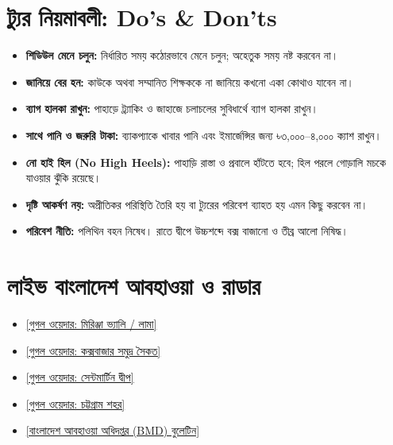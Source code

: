 \documentclass[11pt]{article}
\begin{document}
\section*{ট্যুর নিয়মাবলী: Do's \& Don'ts}
\begin{tcolorbox}[colframe=primary, colback=white, title=\textbf{অবশ্যই পালনীয় (Do's)}]
\small
\begin{itemize}
    \item \textbf{শিডিউল মেনে চলুন:} নির্ধারিত সময় কঠোরভাবে মেনে চলুন; অহেতুক সময় নষ্ট করবেন না।
    \item \textbf{জানিয়ে বের হন:} কাউকে অথবা সম্মানিত শিক্ষককে না জানিয়ে কখনো একা কোথাও যাবেন না।
    \item \textbf{ব্যাগ হালকা রাখুন:} পাহাড়ে ট্র্যাকিং ও জাহাজে চলাচলের সুবিধার্থে ব্যাগ হালকা রাখুন।
    \item \textbf{সাথে পানি ও জরুরি টাকা:} ব্যাকপ্যাকে খাবার পানি এবং ইমার্জেন্সির জন্য ৳৩,০০০--৪,০০০ ক্যাশ রাখুন।
\end{itemize}
\end{tcolorbox}

\vspace{1mm}
\begin{tcolorbox}[colframe=danger, colback=white, title=\textbf{যা একদমই করবেন না (Don'ts)}]
\small
\begin{itemize}
    \item \textbf{নো হাই হিল (No High Heels):} পাহাড়ি রাস্তা ও প্রবালে হাঁটতে হবে; হিল পরলে গোড়ালি মচকে যাওয়ার ঝুঁকি রয়েছে।
    \item \textbf{দৃষ্টি আকর্ষণ নয়:} অপ্রীতিকর পরিস্থিতি তৈরি হয় বা ট্যুরের পরিবেশ ব্যাহত হয় এমন কিছু করবেন না।
    \item \textbf{পরিবেশ নীতি:} পলিথিন বহন নিষেধ। রাতে দ্বীপে উচ্চশব্দে বক্স বাজানো ও তীব্র আলো নিষিদ্ধ।
\end{itemize}
\end{tcolorbox}

\newpage

\section*{লাইভ বাংলাদেশ আবহাওয়া ও রাডার}
\small
\begin{itemize}
    \item \href{https://www.google.com/search?q=weather+Lama+Bandarban+Bangladesh}{\color{primary}[গুগল ওয়েদার: মিরিঞ্জা ভ্যালি / লামা]}
    \item \href{https://www.google.com/search?q=weather+Coxs+Bazar+Bangladesh}{\color{primary}[গুগল ওয়েদার: কক্সবাজার সমুদ্র সৈকত]}
    \item \href{https://www.google.com/search?q=weather+Saint+Martin+Island+Bangladesh}{\color{primary}[গুগল ওয়েদার: সেন্টমার্টিন দ্বীপ]}
    \item \href{https://www.google.com/search?q=weather+Chittagong+Bangladesh}{\color{primary}[গুগল ওয়েদার: চট্টগ্রাম শহর]}
    \item \href{http://live4.bmd.gov.bd/}{\color{primary}[বাংলাদেশ আবহাওয়া অধিদপ্তর (BMD) বুলেটিন]}
\end{itemize}
\end{document}
